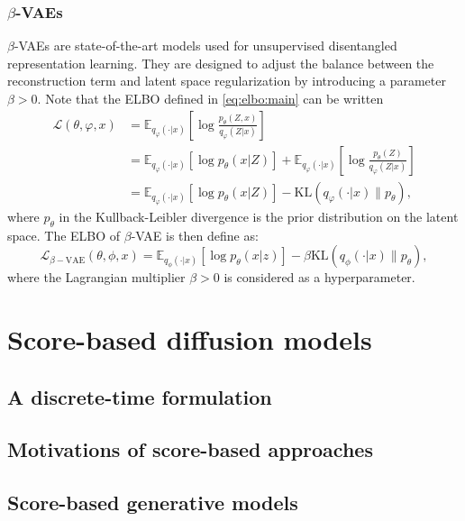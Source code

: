 \documentclass[english,graybox,envcountchap,envcountsame,sectrefs,shortlabels]{svmono}
\theoremstyle{style}
\newcommand{\eqsp}{}
\begin{document}
\subsection{$\beta$-VAEs}
$\beta$-VAEs  are state-of-the-art models used for unsupervised disentangled representation learning. They are designed to adjust the balance between the reconstruction term and latent space regularization by introducing a parameter $\beta>0$.
Note that the ELBO defined in \eqref{eq:elbo:main} can be written
\begin{align*}
\mathcal{L}(\theta,\varphi,x) &= \mathbb{E}_{q_{\varphi}(\cdot|x)}\left[\log \frac{p_\theta(Z,x)}{q_{\varphi}(Z|x)}\right]\\
&= \mathbb{E}_{q_{\varphi}(\cdot|x)}\left[\log p_\theta(x|Z)\right] + \mathbb{E}_{q_{\varphi}(\cdot|x)}\left[\log \frac{p_\theta(Z)}{q_{\varphi}(Z|x)}\right]\\
&=\mathbb{E}_{q_{\varphi}(\cdot|x)}\left[\log p_\theta(x|Z)\right] - \mathrm{KL} (q_{\varphi}(\cdot|x)\|p_\theta)\eqsp,
\end{align*}
where $p_\theta$ in the Kullback-Leibler divergence is the prior distribution on the latent space. The ELBO of $\beta$-VAE is then define as:
$$
\mathcal{L}_{\beta-\text{VAE}}(\theta, \phi, x) = \mathbb{E}_{q_\phi(\cdot|x)}\left[\log p_\theta(x|z)\right] - \beta \mathrm{KL}(q_\phi(\cdot|x)\|p_\theta)\eqsp,
$$
where the Lagrangian multiplier $\beta>0$ is considered as a hyperparameter.




\chapter{Score-based diffusion models}
\minitoc

\section{A discrete-time formulation}

\section{Motivations of score-based approaches}

\section{Score-based generative models}
\end{document}
